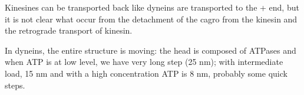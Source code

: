 \documentclass[a4paper, 12pt]{book}
\begin{document}
Kinesines can be transported back like dyneins are transported to the + end, but it is not clear what occur from the detachment of the cagro from the kinesin and the retrograde transport of kinesin.

In dyneins, the entire structure is moving: the head is composed of ATPases and when ATP is at low level, we have very long step (25 nm); with intermediate load, 15 nm and with a high concentration ATP is 8 nm, probably some quick steps. 



  
\end{document}
